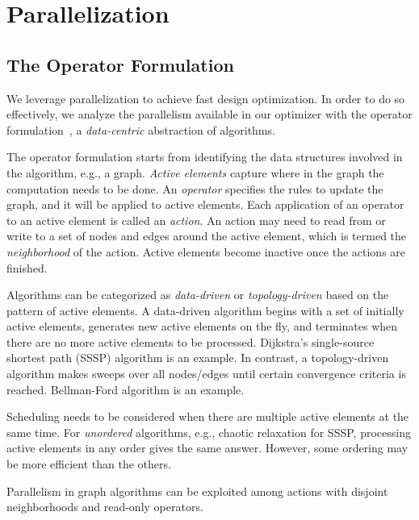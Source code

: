\section{Parallelization}
\subsection{The Operator Formulation}

We leverage parallelization to achieve fast design optimization. In order to do so effectively, we analyze the parallelism available in our optimizer with the operator formulation~\cite{pingali11}, a {\em data-centric} abstraction of algorithms.

The operator formulation starts from identifying the data structures involved in the algorithm, e.g., a graph. {\em Active elements} capture where in the graph the computation needs to be done. An {\em operator} specifies the rules to update the graph, and it will be applied to active elements. Each application of an operator to an active element is called an {\em action}. An action may need to read from or write to a set of nodes and edges around the active element, which is termed the {\em neighborhood} of the action. Active elements become inactive once the actions are finished.

Algorithms can be categorized as {\em data-driven} or {\em topology-driven} based on the pattern of active elements. A data-driven algorithm begins with a set of initially active elements, generates new active elements on the fly, and terminates when there are no more active elements to be processed. Dijkstra's single-source shortest path (SSSP) algorithm is an example. In contrast, a topology-driven algorithm makes sweeps over all nodes/edges until certain convergence criteria is reached. Bellman-Ford algorithm is an example.

Scheduling needs to be considered when there are multiple active elements at the same time. For {\em unordered} algorithms, e.g., chaotic relaxation for SSSP, processing active elements in any order gives the same answer. However, some ordering may be more efficient than the others.


Parallelism in graph algorithms can be exploited among actions with disjoint neighborhoods and read-only operators.

